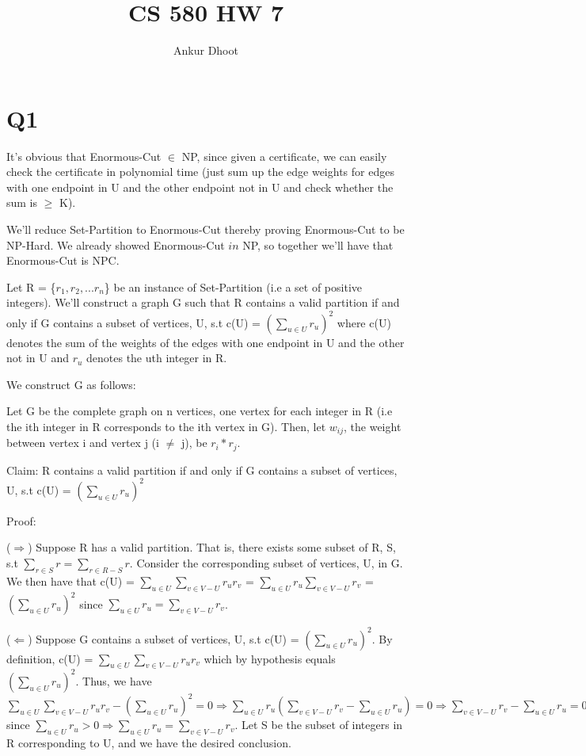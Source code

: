 \documentclass[11pt,a4paper]{article}
\begin{document}
\author{Ankur Dhoot}
\title{CS 580 HW 7}
\maketitle

\section*{Q1}
It's obvious that Enormous-Cut $\in$ NP, since given a certificate, we can easily check the certificate in polynomial time (just sum up the edge weights for edges with one endpoint in U and the other endpoint not in U and check whether the sum is $\geq$ K).

We'll reduce Set-Partition to Enormous-Cut thereby proving Enormous-Cut to be NP-Hard. We already showed Enormous-Cut $in$ NP, so together we'll have that Enormous-Cut is NPC.

Let R = \{$r_{1},r_{2},...r_{n}$\} be an instance of Set-Partition (i.e a set of positive integers). We'll construct a graph G such that R contains a valid partition if and only if G contains a subset of vertices, U, s.t c(U) = $(\sum\limits_{u \in U} r_{u})^{2}$ where c(U) denotes the sum of the weights of the edges with one endpoint in U and the other not in U and $r_{u}$ denotes the uth integer in R.

We construct G as follows: 

Let G be the complete graph on n vertices, one vertex for each integer in R (i.e the ith integer in R corresponds to the ith vertex in G). Then, let $w_{ij}$, the weight between vertex i and vertex j (i $\neq$ j), be $r_{i}*r_{j}$.

Claim: R contains a valid partition if and only if G contains a subset of vertices, U, s.t c(U) = $(\sum\limits_{u \in U} r_{u})^{2}$

Proof:

($\Rightarrow$) Suppose R has a valid partition. That is, there exists some subset of R, S, s.t $\sum\limits_{r \in S} r = \sum\limits_{r \in R - S} r$. Consider the corresponding subset of vertices, U, in G. We then have that c(U) = $\sum\limits_{u \in U} \sum\limits_{v \in V - U} r_{u}r_{v}$ = $\sum\limits_{u \in U} r_{u} \sum\limits_{v \in V - U} r_{v}$ = $(\sum\limits_{u \in U} r_{u})^{2}$ since $\sum\limits_{u \in U} r_{u} = \sum\limits_{v \in V - U} r_{v}$. 

($\Leftarrow$) Suppose G contains a subset of vertices, U, s.t c(U) = $(\sum\limits_{u \in U} r_{u})^{2}$. By definition, c(U) = $\sum\limits_{u \in U} \sum\limits_{v \in V - U} r_{u}r_{v}$ which by hypothesis equals $(\sum\limits_{u \in U} r_{u})^{2}$. Thus, we have $\sum\limits_{u \in U} \sum\limits_{v \in V - U} r_{u}r_{v} - (\sum\limits_{u \in U} r_{u})^{2} = 0 \Rightarrow \sum\limits_{u \in U} r_{u} (\sum\limits_{v \in V - U} r_{v} - \sum\limits_{u \in U} r_{u}) = 0 \Rightarrow \sum\limits_{v \in V - U} r_{v} - \sum\limits_{u \in U} r_{u} = 0$ since $\sum\limits_{u \in U} r_{u} > 0 \Rightarrow \sum\limits_{u \in U} r_{u} = \sum\limits_{v \in V - U} r_{v}$. Let S be the subset of integers in R corresponding to U, and we have the desired conclusion. 
\end{document}
